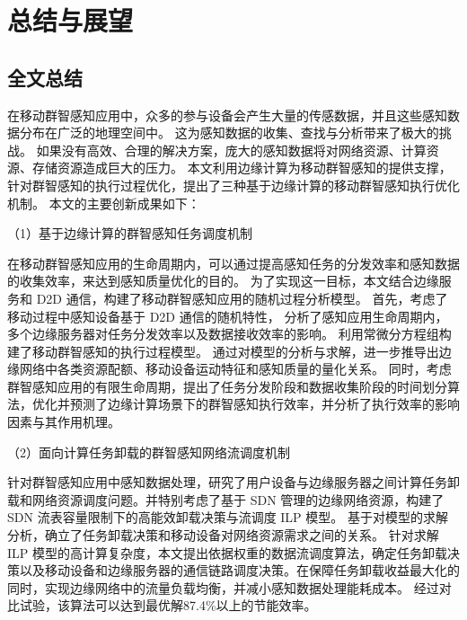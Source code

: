 \chapter{总结与展望}

\section{全文总结}


在移动群智感知应用中，众多的参与设备会产生大量的传感数据，并且这些感知数据分布在广泛的地理空间中。
这为感知数据的收集、查找与分析带来了极大的挑战。
如果没有高效、合理的解决方案，庞大的感知数据将对网络资源、计算资源、存储资源造成巨大的压力。
本文利用边缘计算为移动群智感知的提供支撑，针对群智感知的执行过程优化，提出了三种基于边缘计算的移动群智感知执行优化机制。
本文的主要创新成果如下：

（1）基于边缘计算的群智感知任务调度机制

在移动群智感知应用的生命周期内，可以通过提高感知任务的分发效率和感知数据的收集效率，来达到感知质量优化的目的。
为了实现这一目标，本文结合边缘服务和 D2D 通信，构建了移动群智感知应用的随机过程分析模型。
首先，考虑了移动过程中感知设备基于 D2D 通信的随机特性，
分析了感知应用生命周期内，多个边缘服务器对任务分发效率以及数据接收效率的影响。
利用常微分方程组构建了移动群智感知的执行过程模型。
通过对模型的分析与求解，进一步推导出边缘网络中各类资源配额、移动设备运动特征和感知质量的量化关系。
同时，考虑群智感知应用的有限生命周期，提出了任务分发阶段和数据收集阶段的时间划分算法，优化并预测了边缘计算场景下的群智感知执行效率，并分析了执行效率的影响因素与其作用机理。

（2）面向计算任务卸载的群智感知网络流调度机制

针对群智感知应用中感知数据处理，研究了用户设备与边缘服务器之间计算任务卸载和网络资源调度问题。并特别考虑了基于 SDN 管理的边缘网络资源，构建了 SDN 流表容量限制下的高能效卸载决策与流调度 ILP 模型。
基于对模型的求解分析，确立了任务卸载决策和移动设备对网络资源需求之间的关系。
针对求解 ILP 模型的高计算复杂度，本文提出依据权重的数据流调度算法，确定任务卸载决策以及移动设备和边缘服务器的通信链路调度决策。在保障任务卸载收益最大化的同时，实现边缘网络中的流量负载均衡，并减小感知数据处理能耗成本。
经过对比试验，该算法可以达到最优解87.4\%以上的节能效率。

